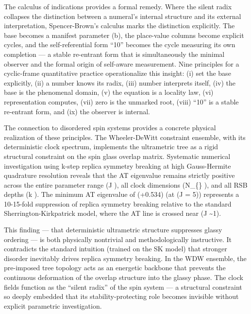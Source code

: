 \documentclass[
]{article}
\begin{document}
The calculus of indications provides a formal remedy. Where the silent
radix collapses the distinction between a numeral's internal structure
and its external interpretation, Spencer-Brown's calculus marks the
distinction explicitly. The base becomes a manifest parameter (b), the
place-value columns become explicit cycles, and the self-referential
form ``10'' becomes the cycle measuring its own completion --- a stable
re-entrant form that is simultaneously the minimal observer and the
formal origin of self-aware measurement. Nine principles for a
cyclic-frame quantitative practice operationalize this insight: (i) set
the base explicitly, (ii) a number knows its radix, (iii) number
interprets itself, (iv) the base is the phenomenal domain, (v) the
equation is a locality law, (vi) representation computes, (vii) zero is
the unmarked root, (viii) ``10'' is a stable re-entrant form, and (ix)
the observer is internal.

The connection to disordered spin systems provides a concrete physical
realization of these principles. The Wheeler-DeWitt constraint ensemble,
with its deterministic clock spectrum, implements the ultrametric tree
as a rigid structural constraint on the spin glass overlap matrix.
Systematic numerical investigation using k-step replica symmetry
breaking at high Gauss-Hermite quadrature resolution reveals that the AT
eigenvalue remains strictly positive across the entire parameter range
(\beta J \in [1, 30]), all clock dimensions (N\_\{\}
\in [3, 11]), and all RSB depths (k \in [2, 11]). The minimum AT
eigenvalue of (+0.534) (at (\beta J = 5)) represents a 10-15-fold
suppression of replica symmetry breaking relative to the standard
Sherrington-Kirkpatrick model, where the AT line is crossed near
(\beta J \sim 1).

This finding --- that deterministic ultrametric structure suppresses
glassy ordering --- is both physically nontrivial and methodologically
instructive. It contradicts the standard intuition (trained on the SK
model) that stronger disorder inevitably drives replica symmetry
breaking. In the WDW ensemble, the pre-imposed tree topology acts as an
energetic backbone that prevents the continuous deformation of the
overlap structure into the glassy phase. The clock fields function as
the ``silent radix'' of the spin system --- a structural constraint so
deeply embedded that its stability-protecting role becomes invisible
without explicit parametric investigation.
\end{document}
